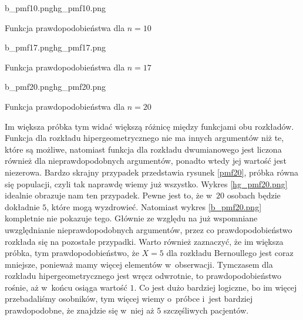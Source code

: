 \begin{diagrams}{b_pmf10.png}{hg_pmf10.png}
	\caption{Funkcja prawdopodobieństwa dla $n=10$}
	\label{pmf10}
\end{diagrams}

\begin{diagrams}{b_pmf17.png}{hg_pmf17.png}
	\caption{Funkcja prawdopodobieństwa dla $n=17$}
	\label{pmf17}
\end{diagrams}

\begin{diagrams}{b_pmf20.png}{hg_pmf20.png}
	\caption{Funkcja prawdopodobieństwa dla $n=20$}
	\label{pmf20}
\end{diagrams}

Im większa próbka tym widać większą różnicę między funkcjami obu rozkładów. Funkcja dla rozkładu hipergeometrycznego nie ma innych argumentów niż te, które są możliwe, natomiast funkcja dla rozkładu dwumianowego jest liczona również dla nieprawdopodobnych argumentów, ponadto wtedy jej wartość jest niezerowa. Bardzo skrajny przypadek przedstawia rysunek \ref{pmf20}, próbka równa się populacji, czyli tak naprawdę wiemy już wszystko. Wykres \ref{hg_pmf20.png} idealnie obrazuje nam ten przypadek. Pewne jest to, że w~$20$ osobach będzie dokładnie $5$, które mogą wyzdrowieć. Natomiast wykres \ref{b_pmf20.png} kompletnie nie pokazuje tego. Głównie ze względu na już wspomniane uwzględnianie nieprawdopodobnych argumentów, przez co prawdopodobieństwo rozkłada się na pozostałe przypadki. Warto również zaznaczyć, że im większa próbka, tym prawdopodobieństwo, że $X=5$ dla rozkładu Bernoullego jest coraz mniejsze, ponieważ mamy więcej elementów w~obserwacji. Tymczasem dla rozkładu hipergeometrycznego jest wręcz odwrotnie, to prawdopodobieństwo rośnie, aż w~końcu osiąga wartość $1$. Co jest dużo bardziej logiczne, bo im więcej przebadaliśmy osobników, tym więcej wiemy o~próbce i~jest bardziej prawdopodobne, że znajdzie się w~niej aż $5$ szczęśliwych pacjentów.

